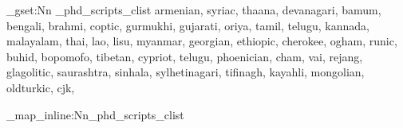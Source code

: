 \ExplSyntaxOff

\NewDocumentCommand{} {
}

\ExplSyntaxOn
\clist_gset:Nn \g_phd_scripts_clist {
      armenian,
      syriac,
      thaana,
      devanagari,
      bamum,
      bengali,
      brahmi,
      coptic,
      gurmukhi,
      gujarati,
      oriya,
      tamil,
      telugu,
      kannada,
      malayalam,
      thai,
      lao,
      lisu,
      myanmar,
      georgian,
      ethiopic,
      cherokee,
      ogham,
      runic,
      buhid,
      bopomofo,
      tibetan,
      cypriot,
      telugu,
      phoenician,
      cham,
      vai,
      rejang,
      glagolitic,
      saurashtra,
         sinhala,
      sylhetinagari,
      tifinagh,
      kayahli,
     mongolian,
     oldturkic,
     cjk,
}

\clist_map_inline:Nn\g_phd_scripts_clist
  {
  }
\ExplSyntaxOff
{}%
\ExplSyntaxOn
\def\textU#1{{\unicodenumberfam #1}}
\ExplSyntaxOff
\def\putunicode@label#1#2;{%
\def\reformat@unicode@string##1{%
   \textU{U+}%
  \let\z\empty%
  \expandafter\@tfor\expandafter\i\expandafter:\expandafter=#2;\do{%
  \if\i;%
    \textU{x}%
  \else%
    \textU{\z}%
  \fi%
  \edef\z{\i}%
 }%
}%
  \makebox[5em]{\reformat@unicode@string{#2}\hfill}%
}
\def\putchar@cx#1{%
\stepcounter{glyph@count}
\let\oldactive@prefix\active@prefix
\let\active@prefix\relax
   \iffontchar\font\n
     \char\the\n$_{\pgfmathparse{Hex(\the\r@cx)}\text{\pgfmathresult}}$%
   \else
    {\arial\graybox}
   \fi
\let\active@prefix\oldactive@prefix
 }
\def\urow@cx#1{%
    \n=#1%
    \r@cx=0%
    \expandafter\putunicode@label#1;%
    \loop%
        \ifnum\n<\numexpr#1+16\relax%
        \makebox[2.1em]{\expandafter\putchar@cx{#1}}%
        \advance\r@cx by1%
        \ifnum\r@cx>16\r@cx=1\relax\else\fi
        \advance\n by1%
    \repeat
    \par
}

\def\typeseturows@cx#1{%
\@for\next:=#1\do{%
  \urow@cx\next\vskip3pt}%
}

\newcount\r@cx%
\newcount\n%
\newcommand\unicodetable[2]{%
\bgroup
  \par
  \leavevmode%
   \r@cx=0%
   {\hbox to 5em{\ignorespaces}}%
   \loop%
    \ifnum\r@cx<16\ignorespaces
    \makebox[2.1em]{\pgfmathparse{Hex(\the\r@cx)}\pgfmathresult}%
    \advance\r@cx by\@ne%
   \repeat
   \vskip3pt\par
   \@nameuse{#1}%
   \typeseturows@cx{#2}%
\egroup
}
\DeclareRobustCommand\unicodenumber[1]{{\ttfamily #1\xspace}}
\def\putdescription#1:{%
  \parindent0pt
  \begin{minipage}[t]{4cm}
  \bgroup\aegean
  \hangindent20pt
  #1\par
  \egroup
  \end{minipage}
}

